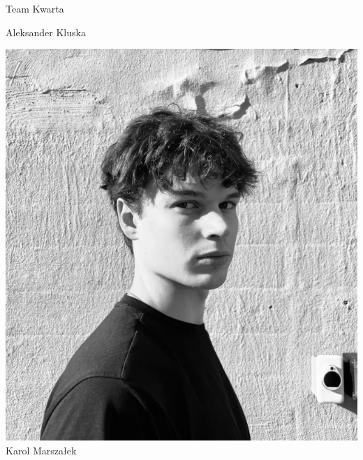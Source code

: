 \begin{frame}[t]{Team Kwarta}
\begin{minipage}{0.22\linewidth}
\scriptsize Aleksander Kluska \\
\scriptsize {}
\end{minipage}

\vspace{1.5em}\pause

\begin{minipage}{0.22\linewidth}
\centering
\includegraphics[width=\linewidth]{img/KM}\\
\scriptsize Karol Marszałek \\
\scriptsize {}
\end{minipage}\pause
\hspace{2em}
\begin{minipage}{0.22\linewidth}
\centering

\end{minipage}
\end{frame}
